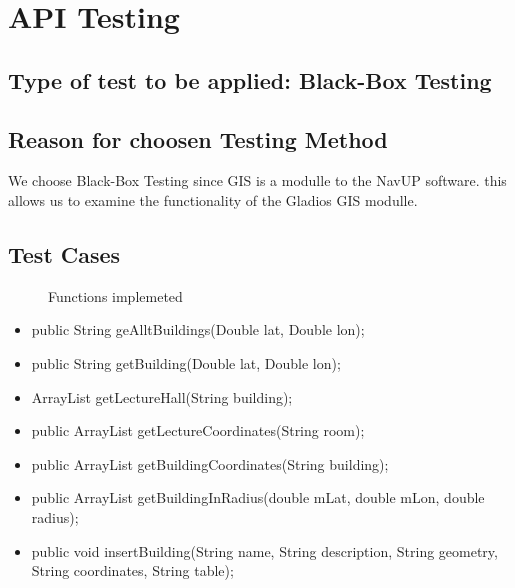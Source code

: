 \documentclass[12pt]{article}
\begin{document}
	

\section{API Testing}
	\subsection{Type of test to be applied: Black-Box Testing}
		\subsection{Reason for choosen Testing Method }
		We choose Black-Box Testing since GIS is a modulle to the NavUP software. this allows us to examine the functionality of 
		the Gladios GIS modulle.


	\subsection{Test Cases}
		\begin{description}
			\item[] Functions implemeted
		\end{description}
	\begin{itemize}
		
		\item{public String geAlltBuildings(Double lat, Double lon);}
		
		
		\item{public String getBuilding(Double lat, Double lon);}
		
		
		\item{ArrayList getLectureHall(String building);}
		
		
		\item{public ArrayList getLectureCoordinates(String room);}
		
		
		\item	{public ArrayList getBuildingCoordinates(String building);   }        
		
		\item{public ArrayList getBuildingInRadius(double mLat, double mLon, double radius);}    
		
		\item {public void insertBuilding(String name, String description, String geometry, String coordinates, String table);}
	\end{itemize}
		
\end{document}
